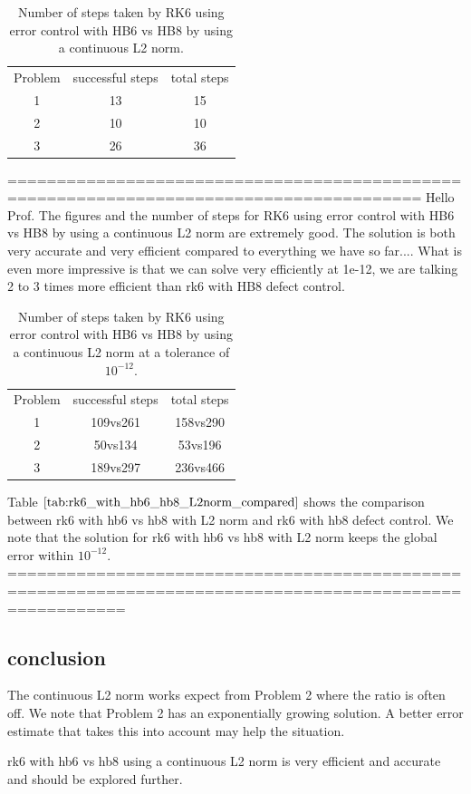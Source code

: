 \begin{table}[h]
\caption {Number of steps taken by RK6 using error control with HB6 vs HB8 by using a continuous L2 norm.} \label{tab:rk6_with_hb6_hb8_L2norm_nsteps}
\begin{center}
\begin{tabular}{ c c c } 
Problem & successful steps & total steps \\ 
1       & 13                         & 15 \\ 
2       & 10                         & 10 \\
3       & 26                         & 36 \\
\end{tabular}
\end{center}
\end{table}

========================================================================================
Hello Prof.
The figures and the number of steps for RK6 using error control with HB6 vs HB8 by using a continuous L2 norm are extremely good. The solution is both very accurate and very efficient compared to everything we have so far.... What is even more impressive is that we can solve very efficiently at 1e-12, we are talking 2 to 3 times more efficient than rk6 with HB8 defect control.

\begin{table}[h]
\caption {Number of steps taken by RK6 using error control with HB6 vs HB8 by using a continuous L2 norm at a tolerance of $10^{-12}$.} \label{tab:rk6_with_hb6_hb8_L2norm_compared}
\begin{center}
\begin{tabular}{ c c c } 
Problem & successful steps & total steps \\ 
1       & 109vs261            & 158vs290 \\ 
2       & 50vs134             & 53vs196 \\
3       & 189vs297            & 236vs466 \\
\end{tabular}
\end{center}
\end{table}

Table $\ref{tab:rk6_with_hb6_hb8_L2norm_compared}$ shows the comparison between rk6 with hb6 vs hb8 with L2 norm and rk6 with hb8 defect control. We note that the solution for rk6 with hb6 vs hb8 with L2 norm keeps the global error within $10^{-12}$.
========================================================================================================
\subsection{conclusion}
The continuous L2 norm works expect from Problem 2 where the ratio is often off. We note that Problem 2 has an exponentially growing solution. A better error estimate that takes this into account may help the situation.

rk6 with hb6 vs hb8 using a continuous L2 norm is very efficient and accurate and should be explored further.